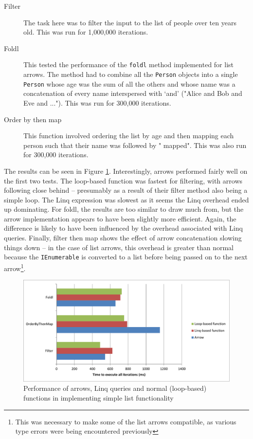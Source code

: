 \documentclass[12pt,twoside,notitlepage]{report}
\begin{document}
\begin{description}
	\item[Filter] The task here was to filter the input to the list of people over ten years old. This was run for 1,000,000 iterations.
	\item[Foldl] This tested the performance of the \texttt{foldl} method implemented for list arrows. The method had to combine all the \texttt{Person} objects into a single \texttt{Person} whose age was the sum of all the others and whose name was a concatenation of every name interspersed with `and' ("Alice and Bob and Eve and ..."). This was run for 300,000 iterations.
	\item[Order by then map] This function involved ordering the list by age and then mapping each person such that their name was followed by " mapped". This was also run for 300,000 iterations.
\end{description}

The results can be seen in Figure \ref{fig:list_function_performance}. Interestingly, arrows performed fairly well on the first two tests. The loop-based function was fastest for filtering, with arrows following close behind -- presumably as a result of their filter method also being a simple loop. The Linq expression was slowest as it seems the Linq overhead ended up dominating. For foldl, the results are too similar to draw much from, but the arrow implementation appears to have been slightly more efficient. Again, the difference is likely to have been influenced by the overhead associated with Linq queries. Finally, filter then map shows the effect of arrow concatenation slowing things down -- in the case of list arrows, this overhead is greater than normal because the \texttt{IEnumerable} is converted to a list before being passed on to the next arrow\footnote{This was necessary to make some of the list arrows compatible, as various type errors were being encountered previously}.

\begin{figure}[!ht]
  \centering
  \includegraphics[width=\textwidth]{fig/ListFunctionPerformanceChart.pdf}
  \caption{Performance of arrows, Linq queries and normal (loop-based) functions in implementing simple list functionality}
  \label{fig:list_function_performance}
\end{figure}
\end{document}
